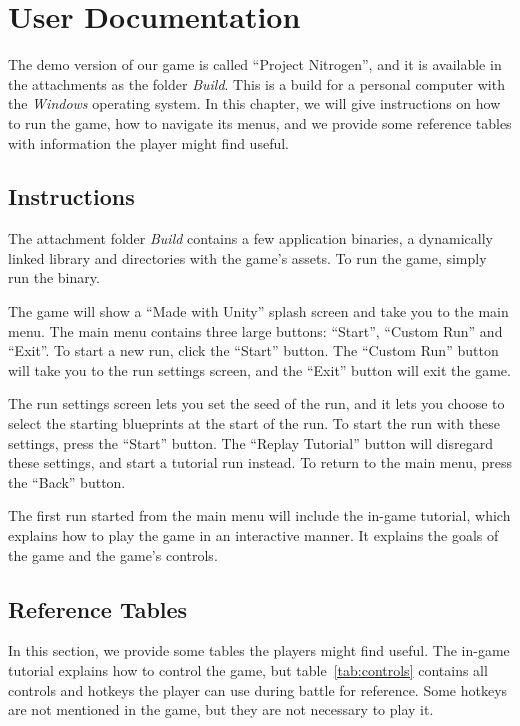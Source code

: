 \chapter{User Documentation}\label{user-docs}

The demo version of our game is called \enquote{Project Nitrogen}, and it is available in the attachments as the folder \emph{Build}.
This is a build for a personal computer with the \emph{Windows} operating system.
In this chapter, we will give instructions on how to run the game, how to navigate its menus, and we provide some reference tables with information the player might find useful.

\section{Instructions}

The attachment folder \emph{Build} contains a few application binaries, a dynamically linked library and directories with the game's assets.
To run the game, simply run the  binary.

The game will show a \enquote{Made with Unity} splash screen and take you to the main menu.
The main menu contains three large buttons: \enquote{Start}, \enquote{Custom Run} and  \enquote{Exit}.
To start a new run, click the \enquote{Start} button.
The \enquote{Custom Run} button will take you to the run settings screen, and the \enquote{Exit} button will exit the game.

The run settings screen lets you set the seed of the run, and it lets you choose to select the starting blueprints at the start of the run.
To start the run with these settings, press the \enquote{Start} button.
The \enquote{Replay Tutorial} button will disregard these settings, and start a tutorial run instead.
To return to the main menu, press the \enquote{Back} button.

The first run started from the main menu will include the in-game tutorial, which explains how to play the game in an interactive manner.
It explains the goals of the game and the game's controls.

\section{Reference Tables}

In this section, we provide some tables the players might find useful.
The in-game tutorial explains how to control the game, but table~\ref{tab:controls} contains all controls and hotkeys the player can use during battle for reference.
Some hotkeys are not mentioned in the game, but they are not necessary to play it.

